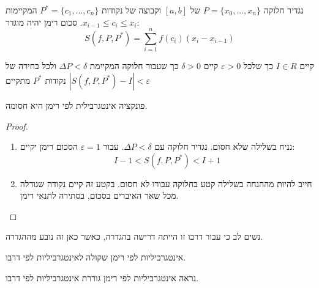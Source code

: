 \documentclass{tstextbook}
\begin{document}
\begin{definition}
נגדיר חלוקה \(P=\{x_0,...,x_n\}\) של \([a, b]\) וקבוצה של נקודות \(P^*=\{c_1,...,c_n \}\) המקיימות \(x_{i-1}\leq c_i\leq x_i\). סכום רימן יהיה מוגדר:
$$S(f, P, P^*)=\sum_{i=1}^n f(c_i)(x_i-x_{i-1})$$

\end{definition}
\begin{definition}
קיים \(I\in R\) כך שלכל \(\varepsilon>0\) קיים \(\delta>0\) כך שעבור חלוקה המקיימת \(\Delta P < \delta\) ולכל בחירה של נקודות \(P^*\) מתקיים \(|S(f,P,P^*)-I|<\varepsilon\)

\end{definition}
\begin{proposition}
פונקציה אינטגרבילית לפי רימן היא חסומה.

\end{proposition}
\begin{proof}
  \begin{enumerate}
    \item נניח בשלילה שלא חסום. נגדיר חלוקה עם \(\Delta P<\delta\). עבור \(\varepsilon=1\) הסכום רימן יקיים: 
$$I-1<S(f,P,P^{*})<I+1$$


    \item חייב להיות מההנחה בשלילה קטע בחלוקה עבורו לא חסום. בקטע זה קיים נקודה שגודלה מכל שאר האיברים בסכום, בסתירה לתנאי רימן. 


  \end{enumerate}
\end{proof}
\begin{remark}
נשים לב כי עבור דרבו זו הייתה דרישה בהגדרה, כאשר כאן זה נובע מההגדרה.

\end{remark}
\begin{theorem}
אינטגרביליות לפי רימן שקולה לאינטגרביליות לפי דרבו.

\end{theorem}
נראה אינטגרביליות לפי רימן גוררת אינטגרביליות לפי דרבו.
\end{document}
